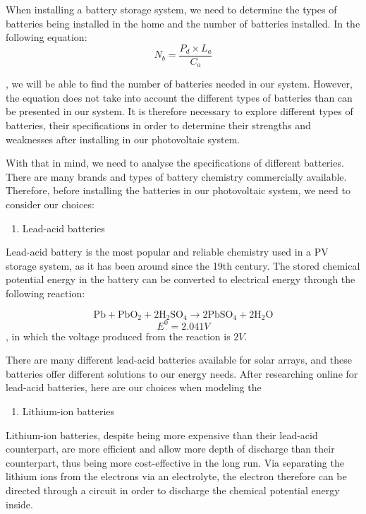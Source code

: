
When installing a battery storage system, we need to determine the types of batteries being installed in the home and the number of batteries installed. In the following equation:
\begin{equation}
    N_b = \frac{P_d \times L_a}{C_a}
\end{equation}

, we will be able to find the number of batteries needed in our system. However, the equation does not take into account the different types of batteries than can be presented in our system. It is therefore necessary to explore different types of batteries, their specifications in order to determine their strengths and weaknesses after installing in our photovoltaic system.

With that in mind, we need to analyse the specifications of different batteries. There are many brands and types of battery chemistry commercially available. Therefore, before installing the batteries in our photovoltaic system, we need to consider our choices:
\begin{enumerate}
    \item Lead-acid batteries
\end{enumerate}
Lead-acid battery is the most popular and reliable chemistry used in a PV storage system, as it has been around since the 19th century. The stored chemical potential energy in the battery can be converted to electrical energy through the following reaction:

$$\mathrm{Pb}+\mathrm{PbO}_{2}+2 \mathrm{H}_{2} \mathrm{SO}_{4} \rightarrow 2 \mathrm{PbSO}_{4}+2 \mathrm{H}_{2} \mathrm{O}$$
$$
E^{0}=2.041 V
$$
, in which the voltage produced from the reaction is $2V$.\cite{wiki:lead_acid_battery}

There are many different lead-acid batteries available for solar arrays, and these batteries offer different solutions to our energy needs. After researching online for lead-acid batteries, here are our choices when modeling the 

\begin{enumerate}[resume]
    \item Lithium-ion batteries
\end{enumerate}
Lithium-ion batteries, despite being more expensive than their lead-acid counterpart, are more efficient and allow more depth of discharge than their counterpart, thus being more cost-effective in the long run. Via separating the lithium ions from the electrons via an electrolyte, the electron therefore can be directed through a circuit in order to discharge the chemical potential energy inside.\cite{wiki:li_ion_battery} \\



